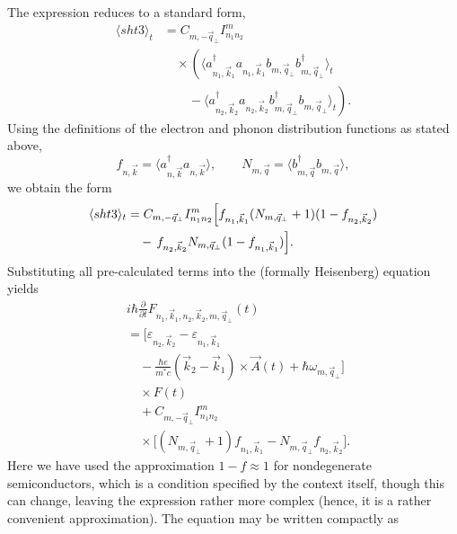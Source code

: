 \documentclass[%
 reprint,
 amsmath,amssymb,
 aps,
]{revtex4-2}
\begin{document}
The expression reduces to a standard form,
\begin{equation}
\begin{split}
\langle sht3 \rangle_t
&=
C_{m,-\vec{q}_{\perp}}
I_{n_1 n_2}^{m}
\\
&\quad\times
\left(
\langle
a_{n_1,\vec{k}_1}^{\dagger}
a_{n_1,\vec{k}_1}
b_{m,\vec{q}_{\perp}}
b_{m,\vec{q}_{\perp}}^{\dagger}
\rangle_t
\right.
\\
&\qquad
-
\left.
\langle
a_{n_2,\vec{k}_2}^{\dagger}
a_{n_2,\vec{k}_2}
b_{m,\vec{q}_{\perp}}^{\dagger}
b_{m,\vec{q}_{\perp}}
\rangle_t
\right).
\end{split}
\end{equation}
Using the definitions of the electron and phonon distribution functions as stated above,
\begin{equation}
f_{n,\vec{k}} =
\langle a_{n,\vec{k}}^{\dagger} a_{n,\vec{k}} \rangle,
\qquad
N_{m,\vec{q}} =
\langle b_{m,\vec{q}}^{\dagger} b_{m,\vec{q}} \rangle,
\end{equation}
we obtain the form
\begin{align}
\langle sht3 \rangle_t
&= C_{m,-\vec{q}_{\perp}}
I_{n_1 n_2}^{m}
\Bigl[
    f_{n_1,\vec{k}_1}(N_{m,\vec{q}_{\perp}}+1)(1-f_{n_2,\vec{k}_2})
\nonumber \\
&\quad
    -\,
    f_{n_2,\vec{k}_2}
    N_{m,\vec{q}_{\perp}}
    (1-f_{n_1,\vec{k}_1})
\Bigr].
\end{align}
Substituting all pre-calculated terms into the (formally Heisenberg) equation yields
\begin{equation}
\begin{split}
&i\hbar
\frac{\partial}{\partial t}
F_{n_1,\vec{k}_1,n_2,\vec{k}_2,m,\vec{q}_{\perp}}(t)\\
&=
\Big[
\varepsilon_{n_2,\vec{k}_2}
-
\varepsilon_{n_1,\vec{k}_1}
\\
&\quad
-
\frac{\hbar e}{m^* c}
(\vec{k}_2-\vec{k}_1)
\times
\vec{A}(t)
+
\hbar \omega_{m,\vec{q}_{\perp}}
\Big]
\\
&\quad\times
F(t)
\\
&\quad
+
C_{m,-\vec{q}_{\perp}}
I_{n_1 n_2}^{m}
\\
&\quad\times
\Big[
(N_{m,\vec{q}_{\perp}}+1)
f_{n_1,\vec{k}_1}
-
N_{m,\vec{q}_{\perp}}
f_{n_2,\vec{k}_2}
\Big].
\end{split}
\end{equation}
Here we have used the approximation $1-f \approx 1$ for nondegenerate semiconductors, which is a condition specified by the context itself, though this can change, leaving the expression rather more complex (hence, it is a rather convenient approximation). The equation may be written compactly as
\end{document}
